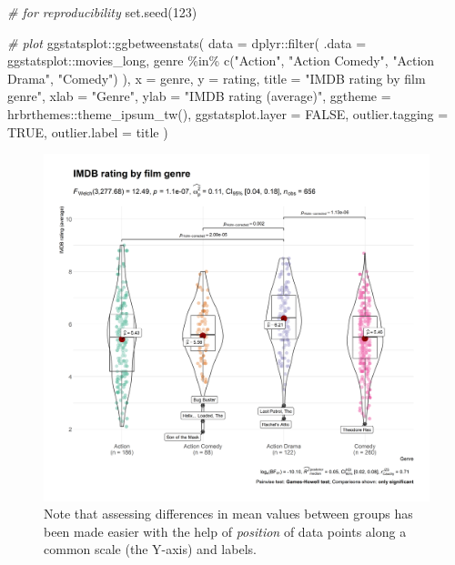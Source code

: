 \documentclass[
]{article}
\newenvironment{Shaded}{\begin{snugshade}}{\end{snugshade}}
\newcommand{\AttributeTok}[1]{\textcolor[rgb]{0.77,0.63,0.00}{#1}}
\newcommand{\CommentTok}[1]{\textcolor[rgb]{0.56,0.35,0.01}{\textit{#1}}}
\newcommand{\ConstantTok}[1]{\textcolor[rgb]{0.00,0.00,0.00}{#1}}
\newcommand{\DecValTok}[1]{\textcolor[rgb]{0.00,0.00,0.81}{#1}}
\newcommand{\FunctionTok}[1]{\textcolor[rgb]{0.00,0.00,0.00}{#1}}
\newcommand{\NormalTok}[1]{#1}
\newcommand{\SpecialCharTok}[1]{\textcolor[rgb]{0.00,0.00,0.00}{#1}}
\newcommand{\StringTok}[1]{\textcolor[rgb]{0.31,0.60,0.02}{#1}}
\begin{document}
\begin{Shaded}
\begin{Highlighting}[]
\CommentTok{\# for reproducibility}
\FunctionTok{set.seed}\NormalTok{(}\DecValTok{123}\NormalTok{)}

\CommentTok{\# plot}
\NormalTok{ggstatsplot}\SpecialCharTok{::}\FunctionTok{ggbetweenstats}\NormalTok{(}
  \AttributeTok{data =}\NormalTok{ dplyr}\SpecialCharTok{::}\FunctionTok{filter}\NormalTok{(}
    \AttributeTok{.data =}\NormalTok{ ggstatsplot}\SpecialCharTok{::}\NormalTok{movies\_long,}
\NormalTok{    genre }\SpecialCharTok{\%in\%} \FunctionTok{c}\NormalTok{(}\StringTok{"Action"}\NormalTok{, }\StringTok{"Action Comedy"}\NormalTok{, }\StringTok{"Action Drama"}\NormalTok{, }\StringTok{"Comedy"}\NormalTok{)}
\NormalTok{  ),}
  \AttributeTok{x =}\NormalTok{ genre,}
  \AttributeTok{y =}\NormalTok{ rating,}
  \AttributeTok{title =} \StringTok{"IMDB rating by film genre"}\NormalTok{,}
  \AttributeTok{xlab =} \StringTok{"Genre"}\NormalTok{,}
  \AttributeTok{ylab =} \StringTok{"IMDB rating (average)"}\NormalTok{,}
  \AttributeTok{ggtheme =}\NormalTok{ hrbrthemes}\SpecialCharTok{::}\FunctionTok{theme\_ipsum\_tw}\NormalTok{(),}
  \AttributeTok{ggstatsplot.layer =} \ConstantTok{FALSE}\NormalTok{,}
  \AttributeTok{outlier.tagging =} \ConstantTok{TRUE}\NormalTok{,}
  \AttributeTok{outlier.label =}\NormalTok{ title}
\NormalTok{)}
\end{Highlighting}
\end{Shaded}

\begin{figure}[H]
\includegraphics[width=1\linewidth]{./figures/paper-fig1-1} \caption{Note that assessing differences in mean values between groups has been made easier with the help of \textit{position} of data points along a common scale (the Y-axis) and labels.}\label{fig:fig1}
\end{figure}
\end{document}

